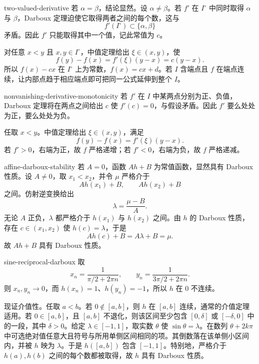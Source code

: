 \begin{solution}{two-valued-derivative}
若 \(\alpha=\beta\)，结论显然。设 \(\alpha\ne\beta\)。若 \(f'\) 在 \(I^\circ\) 中同时取得 \(\alpha\) 与 \(\beta\)，Darboux 定理迫使它取得两者之间的每个数，这与
\[
 f'(I^\circ)\subset\{\alpha,\beta\}
\]
矛盾。因此 \(f'\) 只能取得其中一个值，记此常值为 \(c\)。

对任意 \(x<y\) 且 \(x,y\in I^\circ\)，中值定理给出 \(\xi\in(x,y)\)，使
\[
 f(y)-f(x)=f'(\xi)(y-x)=c(y-x).
\]
所以 \(f(x)-cx\) 在 \(I^\circ\) 上为常数，\(f(x)=cx+d\)。若 \(I\) 含端点且 \(f\) 在端点连续，让内部点趋于相应端点即可把同一公式延伸到整个 \(I\)。
\end{solution}

\begin{solution}{nonvanishing-derivative-monotonicity}
若 \(f'\) 在 \(I\) 中某两点分别为正、负值，Darboux 定理将在两点之间给出 \(c\) 使 \(f'(c)=0\)，与假设矛盾。因此 \(f'\) 要么处处为正，要么处处为负。

任取 \(x<y\)。中值定理给出 \(\xi\in(x,y)\)，满足
\[
 f(y)-f(x)=f'(\xi)(y-x).
\]
若 \(f'>0\)，右端为正，故 \(f\) 严格递增；若 \(f'<0\)，右端为负，故 \(f\) 严格递减。
\end{solution}

\begin{solution}{affine-darboux-stability}
若 \(A=0\)，函数 \(Ah+B\) 为常值函数，显然具有 Darboux 性质。设 \(A\ne0\)，取 \(x_1<x_2\)，并令 \(\mu\) 严格介于
\[
 Ah(x_1)+B,
 \qquad Ah(x_2)+B
\]
之间。仿射逆变换给出
\[
 \lambda=\frac{\mu-B}{A}.
\]
无论 \(A\) 正负，\(\lambda\) 都严格介于 \(h(x_1)\) 与 \(h(x_2)\) 之间。由 \(h\) 的 Darboux 性质，存在 \(c\in(x_1,x_2)\) 使 \(h(c)=\lambda\)，于是
\[
 Ah(c)+B=A\lambda+B=\mu.
\]
故 \(Ah+B\) 具有 Darboux 性质。
\end{solution}

\begin{solution}{sine-reciprocal-darboux}
取
\[
 x_n=\frac1{\pi/2+2\pi n},
 \qquad
 y_n=\frac1{3\pi/2+2\pi n}.
\]
则 \(x_n,y_n\to0\)，而 \(h(x_n)=1\)、\(h(y_n)=-1\)，所以 \(h\) 在 \(0\) 不连续。

现证介值性。任取 \(a<b\)。若 \(0\notin[a,b]\)，则 \(h\) 在 \([a,b]\) 连续，通常的介值定理适用。若 \(0\in[a,b]\)，且 \([a,b]\) 不退化，则该区间至少包含 \([0,\delta]\) 或 \([-\delta,0]\) 中的一段，其中 \(\delta>0\)。给定 \(\lambda\in[-1,1]\)，取实数 \(\theta\) 使 \(\sin\theta=\lambda\)。在数列 \(\theta+2k\pi\) 中可选绝对值任意大且符号与所用单侧区间相同的项。其倒数落在该单侧小区间内，并被 \(h\) 映为 \(\lambda\)。于是 \(h([a,b])\) 包含 \([-1,1]\)。特别地，严格介于 \(h(a),h(b)\) 之间的每个数都被取得，故 \(h\) 具有 Darboux 性质。
\end{solution}

